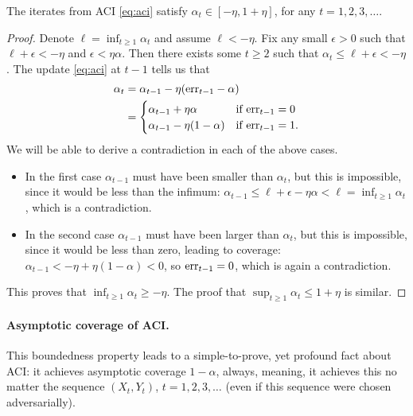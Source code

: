 \documentclass{article}
\begin{document}
\begin{lemma}
\label{lem:aci_bounded}
The iterates from ACI \eqref{eq:aci} satisfy $\alpha_t \in [-\eta, 1+\eta]$, for
any $t=1,2,3,\ldots$.  
\end{lemma}

\begin{proof}
Denote $\ell = \inf_{t \geq 1} \alpha_t$ and assume $\ell < -\eta$. Fix any
small $\epsilon>0$ such that $\ell + \epsilon < -\eta$ and $\epsilon <
\eta\alpha$. Then there exists some $t \geq 2$ such that $\alpha_t  \leq \ell +
\epsilon < -\eta$. The update \eqref{eq:aci} at $t-1$ tells us that 
\begin{align*}
\alpha_t &= \alpha_{t-1} - \eta(\text{err}_{t-1} - \alpha) \\
&= \begin{cases} 
\alpha_{t-1} + \eta\alpha & \text{if $\text{err}_{t-1} = 0$} \\ 
\alpha_{t-1} - \eta(1-\alpha) & \text{if $\text{err}_{t-1} = 1$}. 
\end{cases}
\end{align*}
We will be able to derive a contradiction in each of the above cases. 
\begin{itemize}
\item In the first case $\alpha_{t-1}$ must have been smaller than $\alpha_t$,
  but this is impossible, since it would be less than the infimum:
  $\alpha_{t-1} \leq \ell + \epsilon - \eta\alpha < \ell = \inf_{t \geq 1}
  \alpha_t$, which is a contradiction.           
\item In the second case $\alpha_{t-1}$ must have been larger than $\alpha_t$,
  but this is impossible, since it would be less than zero, leading to coverage: 
  $\alpha_{t-1} <  -\eta + \eta(1-\alpha) < 0$, so $\text{err}_{t-1}=0$, which is
  again a contradiction.        
\end{itemize}
This proves that $\inf_{t \geq 1} \alpha_t \geq -\eta$. The proof that $\sup_{t
  \geq 1} \alpha_t \leq 1+\eta$ is similar.      
\end{proof}

\paragraph{Asymptotic coverage of ACI.}

This boundedness property leads to a simple-to-prove, yet profound fact about
ACI: it achieves asymptotic coverage $1-\alpha$, always, meaning, it achieves
this no matter the sequence $(X_t,Y_t)$, $t=1,2,3,\ldots$ (even if this sequence 
were chosen adversarially). 
\end{document}
